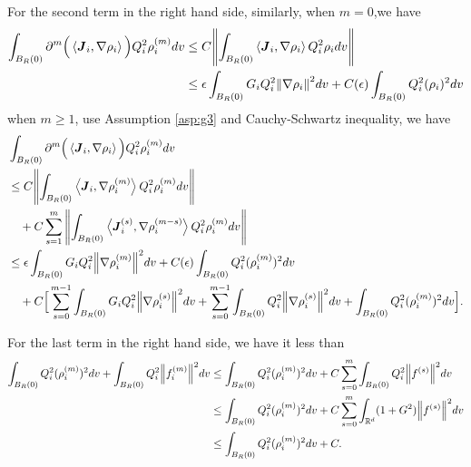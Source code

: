 \documentclass[a4paper, 11pt]{article}
\newcommand{\inner}[2]{\left< #1 , #2 \right>}
\theoremstyle{plain}
\theoremstyle{remark}
\theoremstyle{definition}
\newcommand{\intd}{\int_{\mathbb{R}^d}}
\newcommand{\intr}{\int_{B_R(0)}}
\newcommand{\Q}{Q}
\newcommand{\J}{\boldsymbol{J}}
\begin{document}
	
	For the second term in the right hand side, similarly, when $m=0$,we have
	\begin{equation}
			\begin{aligned}
				\intr\partial^{m}\Big(\inner{\J_i}{\nabla\rho_i}\Big)\Q_i^2\rho_i^{(m)}dv&\leq C\norm{\intr \inner{\J_i}{\nabla\rho_i}\Q_i^2\rho_idv}\\
				&\leq \epsilon\intr G_i\Q_i^2\norm{\nabla\rho_i}^2dv+C(\epsilon)\intr \Q_i^2(\rho_i)^2dv
			\end{aligned}
	\end{equation}
	when $m\geq 1$, use Assumption \ref{asp:g3} and Cauchy-Schwartz inequality, we have 
	\begin{equation}
		\begin{aligned}
			&\intr\partial^{m}\Big(\inner{\J_i}{\nabla\rho_i}\Big)\Q_i^2\rho_i^{(m)}dv\\&\leq C\norm{\intr \inner{\J_i}{\nabla\rho_i^{(m)}}\Q_i^2\rho_i^{(m)}dv}\\
			&\quad +C\sum_{s=1}^m\norm{\intr \inner{\J_i^{(s)}}{\nabla\rho_i^{(m-s)}}\Q_i^2\rho_i^{(m)}dv}\\
			&\leq \epsilon\intr G_i\Q_i^2\norm{\nabla\rho_i^{(m)}}^2dv+C(\epsilon)\intr \Q_i^2(\rho_i^{(m)})^2dv\\
			&\quad+C\Big[\sum_{s=0}^{m-1}\intr G_i\Q_i^2\norm{\nabla\rho_i^{(s)}}^2dv+\sum_{s=0}^{m-1}\intr Q_i^2\norm{\nabla\rho_i^{(s)}}^2dv+\intr \Q_i^2(\rho_i^{(m)})^2dv\Big].
		\end{aligned}
	\end{equation}
    
	For the last term in the right hand side, we have it less than
    \begin{equation}
       \begin{aligned}
            \intr Q_i^2(\rho_i^{(m)})^2dv+\intr Q_i^2\norm{f_i^{(m)}}^2dv&\leq \intr Q_i^2(\rho_i^{(m)})^2dv+C\sum_{s=0}^m\intr Q_i^2\norm{f^{(s)}}^2dv\\
            &\leq \intr Q_i^2(\rho_i^{(m)})^2dv+C\sum_{s=0}^m\intd(1+G^2)\norm{f^{(s)}}^2dv\\
            &\leq \intr Q_i^2(\rho_i^{(m)})^2dv+C.
       \end{aligned}
    \end{equation}
    
\end{document}
